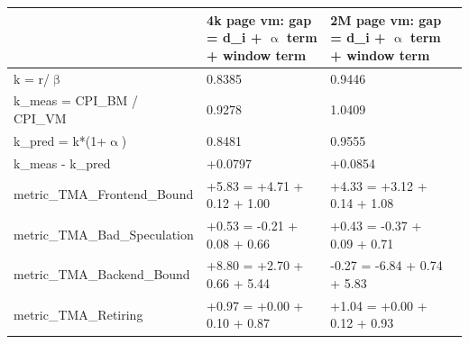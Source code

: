 \documentclass[12pt]{article}
\newcommand\tablefont{\normalfont}}}}
\begin{document}
\par\begingroup\tablefont\fontsize{11pt}{13.42pt}\selectfont\setlength{\tabcolsep}{5.40pt}
\noindent\hspace*{5.00pt}\begin{tabular}{|b{139.20pt}|b{144.20pt}|b{144.20pt}|@{}b{0pt}@{}}
\hline
\centering\arraybackslash{} & \centering\arraybackslash{}4k page vm: gap = d\_\allowbreak{}i + \ensuremath{\upalpha} term + window term & \centering\arraybackslash{}2M page vm: gap = d\_\allowbreak{}i + \ensuremath{\upalpha} term + window term & \rule[-0.00pt]{0pt}{12.25pt} \\ \hline
\centering\arraybackslash{}k = r/\ensuremath{\upbeta} & \centering\arraybackslash{}0.8385 & \centering\arraybackslash{}0.9446 & \rule[-0.00pt]{0pt}{12.25pt} \\ \hline
\centering\arraybackslash{}k\_\allowbreak{}meas = CPI\_\allowbreak{}BM / CPI\_\allowbreak{}VM & \centering\arraybackslash{}0.9278 & \centering\arraybackslash{}1.0409 & \rule[-0.00pt]{0pt}{12.25pt} \\ \hline
\centering\arraybackslash{}k\_\allowbreak{}pred = k*(1+\ensuremath{\upalpha}) & \centering\arraybackslash{}0.8481 & \centering\arraybackslash{}0.9555 & \rule[-0.00pt]{0pt}{12.25pt} \\ \hline
\centering\arraybackslash{}k\_\allowbreak{}meas - k\_\allowbreak{}pred & \centering\arraybackslash{}+0.0797 & \centering\arraybackslash{}+0.0854 & \rule[-0.00pt]{0pt}{12.25pt} \\ \hline
\cellcolor[HTML]{F8CBAD}\centering\arraybackslash{}metric\_\allowbreak{}TMA\_\allowbreak{}Frontend\_\allowbreak{}Bound & \cellcolor[HTML]{F8CBAD}\centering\arraybackslash{}+5.83 = +4.71 + 0.12 + 1.00 & \cellcolor[HTML]{F8CBAD}\centering\arraybackslash{}+4.33 = +3.12 + 0.14 + 1.08 & \rule[-0.00pt]{0pt}{12.25pt} \\ \hline
\centering\arraybackslash{}metric\_\allowbreak{}TMA\_\allowbreak{}Bad\_\allowbreak{}Speculation & \centering\arraybackslash{}+0.53 = -0.21 + 0.08 + 0.66 & \centering\arraybackslash{}+0.43 = -0.37 + 0.09 + 0.71 & \rule[-0.00pt]{0pt}{12.25pt} \\ \hline
\cellcolor[HTML]{F8CBAD}\centering\arraybackslash{}metric\_\allowbreak{}TMA\_\allowbreak{}Backend\_\allowbreak{}Bound & \cellcolor[HTML]{F8CBAD}\centering\arraybackslash{}+8.80 = +2.70 + 0.66 + 5.44 & \cellcolor[HTML]{F8CBAD}\centering\arraybackslash{}-0.27 = -6.84 + 0.74 + 5.83 & \rule[-0.00pt]{0pt}{12.25pt} \\ \hline
\centering\arraybackslash{}metric\_\allowbreak{}TMA\_\allowbreak{}Retiring & \centering\arraybackslash{}+0.97 = +0.00 + 0.10 + 0.87 & \centering\arraybackslash{}+1.04 = +0.00 + 0.12 + 0.93 & \rule[-0.00pt]{0pt}{12.25pt} \\ \hline
\end{tabular}\par\endgroup\par
\end{document}
